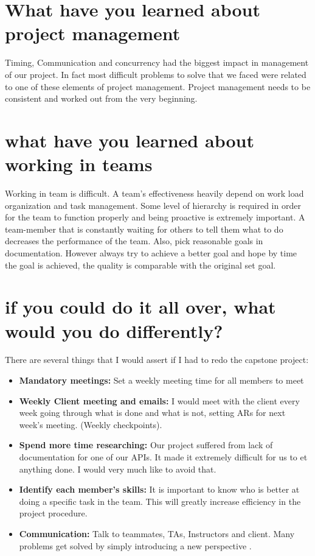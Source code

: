\documentclass[journal,10pt,onecolumn,compsoc]{IEEEtran}
\begin{document}
\section{What have you learned about project management}
\noindent Timing, Communication and concurrency had the biggest impact in management of our project. In fact most difficult problems to solve that we faced were related to one of these elements of project management. Project management needs to be consistent and worked out from the very beginning.

\section{what have you learned about working in teams}
\noindent Working in team is difficult. A team's effectiveness heavily depend on work load organization and task management. Some level of hierarchy is required in order for the team to function properly and being proactive is extremely important. A team-member that is constantly waiting for others to tell them what to do decreases the performance of the team. Also, pick reasonable goals in documentation. However always try to achieve a better goal and hope by time the goal is achieved, the quality is comparable with the original set goal.

\section{if you could do it all over, what would you do differently?}
\noindent There are several things that I would assert if I had to redo the capstone project:
\begin{itemize}
\item \textbf{Mandatory meetings:} Set a weekly meeting time for all members to meet
\item \textbf{Weekly Client meeting and emails:} I would meet with the client every week going through what is done and what is not, setting ARs for next week's meeting. (Weekly checkpoints).
\item \textbf{Spend more time researching:} Our project suffered from lack of documentation for one of our APIs. It made it extremely difficult for us to et anything done. I would very much like to avoid that.
\item \textbf{Identify each member's skills:} It is important to know who is better at doing a specific task in the team. This will greatly increase efficiency in the project procedure.
\item \textbf{Communication:} Talk to teammates, TAs, Instructors and client. Many problems get solved by simply introducing a new perspective .
\end{itemize}
\end{document}
